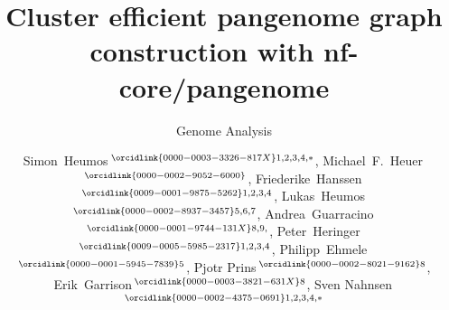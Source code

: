 \documentclass{bioinfo}
\theoremstyle{definition}
\begin{document}

    \subtitle{Genome Analysis}

    \title[Cluster efficient pangenome graph construction with nf-core/pangenome]{Cluster efficient pangenome graph construction with nf-core/pangenome}
    
	\author[Heumos, Guarracino \textit{et~al}.]{
        Simon~Heumos\,$^{\orcidlink{0000-0003-3326-817X}1,2,3,4,*}$,
        Michael~F.~Heuer\,$^{\orcidlink{0000-0002-9052-6000}}$,
        Friederike~Hanssen\,$^{\orcidlink{0009-0001-9875-5262}1,2,3,4}$,
        Lukas~Heumos\,$^{\orcidlink{0000-0002-8937-3457}5,6,7}$,
        Andrea~Guarracino\,$^{\orcidlink{0000-0001-9744-131X}8,9,}$,
        Peter~Heringer\,$^{\orcidlink{0009-0005-5985-2317}1,2,3,4}$,
        Philipp~Ehmele\,$^{\orcidlink{0000-0001-5945-7839}5}$,
        Pjotr Prins\,$^{\orcidlink{0000-0002-8021-9162}8}$,
        Erik~Garrison\,$^{\orcidlink{0000-0003-3821-631X}8}$,
        Sven Nahnsen\,$^{\orcidlink{0000-0002-4375-0691}1,2,3,4,*}$
    }

    \address{
	$^1$Quantitative Biology Center (QBiC) Tübingen, University of Tübingen, Tübingen, Germany \\ 
	$^2$Biomedical Data Science, Dept. of Computer Science, University of Tübingen, Tübingen, Germany \\ 
	$^3$M3 Research Center, University Hospital Tübingen, Tübingen, Germany \\ 
	$^4$Institute for Bioinformatics and Medical Informatics (IBMI), Eberhard-Karls University of Tübingen, Tübingen, Germany \\ 
	$^5$Institute of Computational Biology, Department of Computational Health, Helmholtz Munich, Germany \\ 
	$^6$Comprehensive Pneumology Center with the CPC-M bioArchive, Helmholtz Zentrum Munich, Member of the German Center for Lung Research (DZL), Munich, Germany \\ 
	$^7$TUM School of Life Sciences Weihenstephan, Technical University of Munich, Freising, Germany \\
	$^{8}$Department of Genetics, Genomics and Informatics, University of Tennessee Health Science Center, 71 S Manassas St, Memphis, 38163, Tennessee, USA \\ 
	$^{9}$Human Technopole, Viale Rita Levi-Montalcini 1, 20157, Milan, Italy \\
    }
\end{document}
